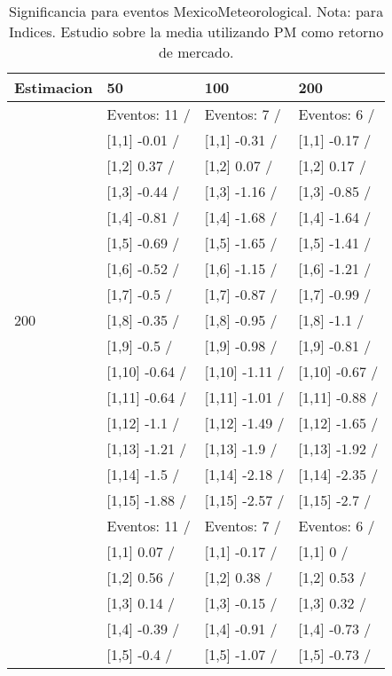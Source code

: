 \begin{table}

\caption{Significancia para eventos MexicoMeteorological. Nota: para Indices. Estudio sobre la media utilizando PM como retorno de mercado.}
\centering
\begin{tabular}[t]{llll}
\toprule
Estimacion & 50 & 100 & 200\\
\midrule
 & Eventos:  11 / & Eventos:  7 / & Eventos:  6 /\\
 & {}[1,1] -0.01  / & {}[1,1] -0.31  / & {}[1,1] -0.17  /\\
 & {}[1,2] 0.37  / & {}[1,2] 0.07  / & {}[1,2] 0.17  /\\
 & {}[1,3] -0.44  / & {}[1,3] -1.16  / & {}[1,3] -0.85  /\\
 & {}[1,4] -0.81  / & {}[1,4] -1.68  / & {}[1,4] -1.64  /\\
\addlinespace
 & {}[1,5] -0.69  / & {}[1,5] -1.65  / & {}[1,5] -1.41  /\\
 & {}[1,6] -0.52  / & {}[1,6] -1.15  / & {}[1,6] -1.21  /\\
 & {}[1,7] -0.5  / & {}[1,7] -0.87  / & {}[1,7] -0.99  /\\
200 & {}[1,8] -0.35  / & {}[1,8] -0.95  / & {}[1,8] -1.1  /\\
 & {}[1,9] -0.5  / & {}[1,9] -0.98  / & {}[1,9] -0.81  /\\
\addlinespace
 & {}[1,10] -0.64  / & {}[1,10] -1.11  / & {}[1,10] -0.67  /\\
 & {}[1,11] -0.64  / & {}[1,11] -1.01  / & {}[1,11] -0.88  /\\
 & {}[1,12] -1.1  / & {}[1,12] -1.49  / & {}[1,12] -1.65  /\\
 & {}[1,13] -1.21  / & {}[1,13] -1.9  / & {}[1,13] -1.92  /\\
 & {}[1,14] -1.5  / & {}[1,14] -2.18  / & {}[1,14] -2.35  /\\
\addlinespace
 & {}[1,15] -1.88  / & {}[1,15] -2.57  / & {}[1,15] -2.7  /\\
 & Eventos:  11 / & Eventos:  7 / & Eventos:  6 /\\
 & {}[1,1] 0.07  / & {}[1,1] -0.17  / & {}[1,1] 0  /\\
 & {}[1,2] 0.56  / & {}[1,2] 0.38  / & {}[1,2] 0.53  /\\
 & {}[1,3] 0.14  / & {}[1,3] -0.15  / & {}[1,3] 0.32  /\\
\addlinespace
 & {}[1,4] -0.39  / & {}[1,4] -0.91  / & {}[1,4] -0.73  /\\
 & {}[1,5] -0.4  / & {}[1,5] -1.07  / & {}[1,5] -0.73  /\\

\end{tabular}
\end{table}
